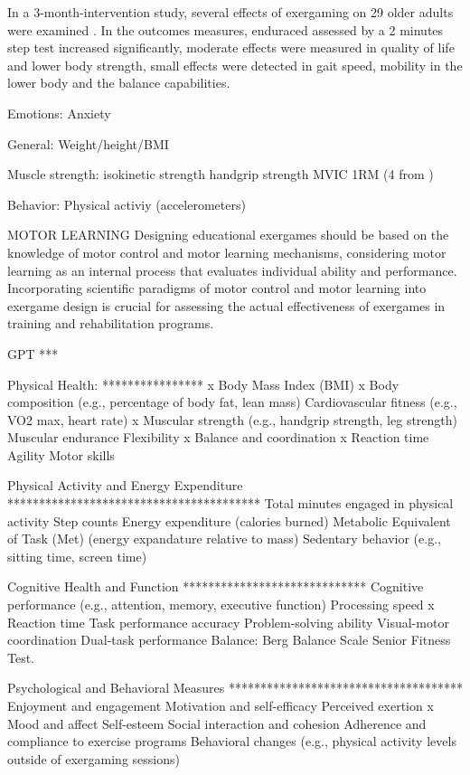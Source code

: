 In a 3-month-intervention study, several effects of exergaming on 29 older adults were examined \cite{neumann2018effects}. In the outcomes measures, enduraced assessed by a 2 minutes step test increased significantly, moderate effects were measured in quality of life and lower body strength, small effects were detected in gait speed, mobility in the lower body and the balance capabilities.



Emotions:
Anxiety

General:
Weight/height/BMI

Muscle strength: 
isokinetic strength
handgrip strength
MVIC
1RM (4 from \cite{viana2021effects})

Behavior:
Physical activiy (accelerometers)


MOTOR LEARNING
Designing educational exergames should be based on the knowledge of motor control and motor learning mechanisms, considering motor learning as an internal process that evaluates individual ability and performance. Incorporating scientific paradigms of motor control and motor learning into exergame design is crucial for assessing the actual effectiveness of exergames in training and rehabilitation programs. \cite{di2012exergames}


GPT
***

Physical Health:
****************
x Body Mass Index (BMI)
x Body composition (e.g., percentage of body fat, lean mass)
Cardiovascular fitness (e.g., VO2 max, heart rate)
x Muscular strength (e.g., handgrip strength, leg strength)
Muscular endurance
Flexibility
x Balance and coordination
x Reaction time
Agility
Motor skills

Physical Activity and Energy Expenditure
****************************************
Total minutes engaged in physical activity
Step counts
Energy expenditure (calories burned)
Metabolic Equivalent of Task (Met) (energy expandature relative to mass)
Sedentary behavior (e.g., sitting time, screen time)

Cognitive Health and Function
*****************************
Cognitive performance (e.g., attention, memory, executive function)
Processing speed
x Reaction time
Task performance accuracy
Problem-solving ability
Visual-motor coordination
Dual-task performance
Balance:					Berg Balance Scale
                            Senior Fitness Test.

Psychological and Behavioral Measures
*************************************
Enjoyment and engagement
Motivation and self-efficacy
Perceived exertion
x Mood and affect
Self-esteem
Social interaction and cohesion
Adherence and compliance to exercise programs
Behavioral changes (e.g., physical activity levels outside of exergaming sessions)



